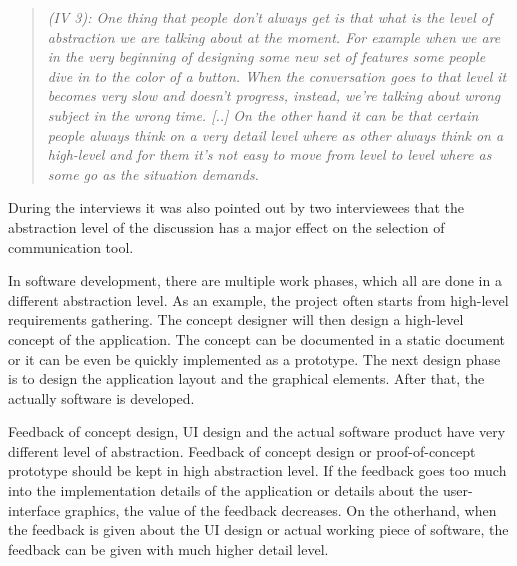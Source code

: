 \documentclass[english,12pt,a4paper,pdftex]{article}
\newcommand{\q}[2]{
\begin{quote}
\emph{(IV #1): #2}
\end{quote}}
\begin{document}

\q{3}{One thing that people don't always get is that what is the level of abstraction we are talking about at the moment. For example when we are in the very beginning of designing some new set of features some people dive in to the color of a button. When the conversation goes to that level it becomes very slow and doesn't progress, instead, we're talking about wrong subject in the wrong time. [..] On the other hand it can be that certain people always think on a very detail level where as other always think on a high-level and for them it's not easy to move from level to level where as some go as the situation demands.}

During the interviews it was also pointed out by two interviewees that the abstraction level of the discussion has a major effect on the selection of communication tool.

In software development, there are multiple work phases, which all are done in a different abstraction level. As an example, the project often starts from high-level requirements gathering. The concept designer will then design a high-level concept of the application. The concept can be documented in a static document or it can be even be quickly implemented as a prototype. The next design phase is to design the application layout and the graphical elements. After that, the actually software is developed.

Feedback of concept design, UI design and the actual software product have very different level of abstraction. Feedback of concept design or proof-of-concept prototype should be kept in high abstraction level. If the feedback goes too much into the implementation details of the application or details about the user-interface graphics, the value of the feedback decreases. On the otherhand, when the feedback is given about the UI design or actual working piece of software, the feedback can be given with much higher detail level.
\end{document}
